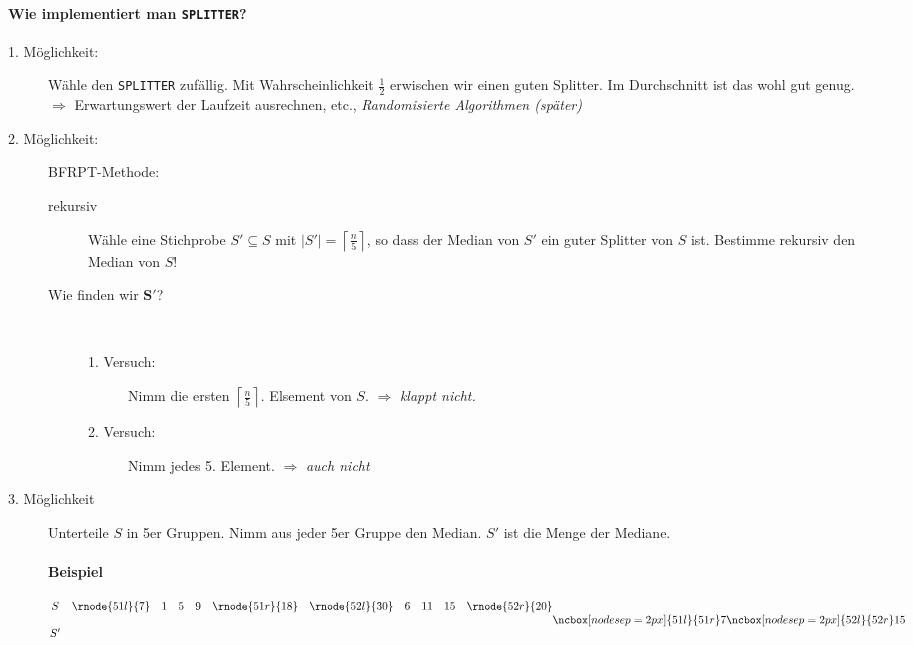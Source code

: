 \paragraph{Wie implementiert man \texttt{SPLITTER}?}
\begin{description}
 \item[1. Möglichkeit:] Wähle den \texttt{SPLITTER} zufällig. Mit Wahrscheinlichkeit $\frac{1}{2}$ erwischen wir einen guten Splitter.
		Im Durchschnitt ist das wohl gut genug. \\
		$\Rightarrow$ Erwartungswert der Laufzeit ausrechnen, etc., \emph{Randomisierte Algorithmen (später)}
 \item[2. Möglichkeit:] BFRPT-Methode:
		\begin{description}
		\item[rekursiv] Wähle eine Stichprobe $S' \subseteq S$ mit $|S'| = \left\lceil\frac{n}{5}\right\rceil$, so dass der Median von $S'$ ein guter Splitter von $S$ ist. Bestimme rekursiv den Median von $S$!
		\item[Wie finden wir $\boldsymbol{S'}$?]\hspace{0cm}\\
			\begin{description}
			\item[1. Versuch:] Nimm die ersten $\left\lceil\frac{n}{5}\right\rceil$. Elsement von $S$. $\Rightarrow$ \emph{klappt nicht.}
			\item[2. Versuch:] Nimm jedes 5. Element. $\Rightarrow$ \emph{auch nicht}
			\end{description}
		\end{description}
 \item[3. Möglichkeit] Unterteile $S$ in 5er Gruppen. Nimm aus jeder 5er Gruppe den Median. $S'$ ist die Menge der Mediane.
		\paragraph{Beispiel}
		\[
		\begin{matrix}
		 S & \rnode{51l}{7} & 1 & 5 & 9 & \rnode{51r}{18} \\&\\
		 S' 
		\end{matrix}\quad
		\begin{matrix}
		 \rnode{52l}{30} & 6 & 11 & 15 & \rnode{52r}{20} \\&\\
		 &
		\end{matrix}
		\ncbox[nodesep=2px]{51l}{51r}7
		\ncbox[nodesep=2px]{52l}{52r}15
		\]

\end{description}
